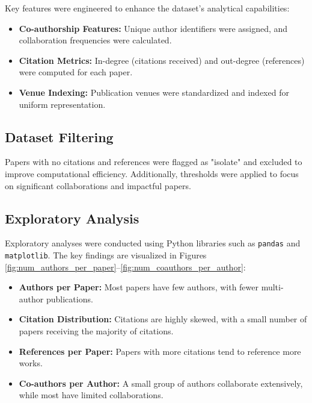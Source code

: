 \documentclass[11pt]{article}
\begin{document}
Key features were engineered to enhance the dataset’s analytical capabilities:
\begin{itemize}
	\item \textbf{Co-authorship Features:} Unique author identifiers were assigned, and collaboration frequencies were calculated.
	\item \textbf{Citation Metrics:} In-degree (citations received) and out-degree (references) were computed for each paper.
	\item \textbf{Venue Indexing:} Publication venues were standardized and indexed for uniform representation.
\end{itemize}

\subsection{Dataset Filtering}

Papers with no citations and references were flagged as "isolate" and excluded to improve computational efficiency. Additionally, thresholds were applied to focus on significant collaborations and impactful papers.

\subsection{Exploratory Analysis}

Exploratory analyses were conducted using Python libraries such as \texttt{pandas} and \texttt{matplotlib}. The key findings are visualized in Figures \ref{fig:num_authors_per_paper}--\ref{fig:num_coauthors_per_author}:

\begin{itemize}
	\item \textbf{Authors per Paper:} Most papers have few authors, with fewer multi-author publications.
	\item \textbf{Citation Distribution:} Citations are highly skewed, with a small number of papers receiving the majority of citations.
	\item \textbf{References per Paper:} Papers with more citations tend to reference more works.
	\item \textbf{Co-authors per Author:} A small group of authors collaborate extensively, while most have limited collaborations.
\end{itemize}
\end{document}
